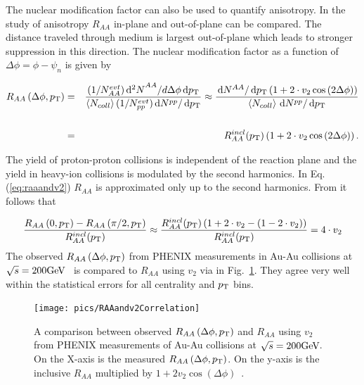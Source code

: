 The nuclear modification factor can also be used to quantify anisotropy. In the study of anisotropy $R_{AA}$ in-plane and out-of-plane can be compared. The distance traveled through medium is largest out-of-plane which leads to stronger suppression in this direction. The nuclear modification factor as a function of $\Delta\phi=\phi-\psi_n$ is given by

\begin{eqnarray}
R_{AA}\left(\Delta\phi, p_{\rm T}\right) &=& \frac{(1/N_{AA}^{evt})\,\textrm d{^2N}^{AA}/d\Delta\phi \,\textrm d{p_{\rm T}}}{\left< N_{coll}\right> (1/N_{pp}^{evt})\,\textrm d{N^{pp}}/\,\textrm d{p_{\rm T}}} \approx \frac{\,\textrm d{N^{AA}}/\,\textrm d{p_{\rm T}}\left( 1+2\cdot v_2\cos{(2\Delta\phi)} \right)}{\left< N_{coll}\right> \,\textrm d{N^{pp}}/\,\textrm d{p_{\rm T}}} \nonumber \\ &&\nonumber\\
&=& R_{AA}^{incl}(p_{\rm T}) \left( 1+2\cdot v_2\cos{(2\Delta\phi)} \right).
\label{eq:raaandv2}
\end{eqnarray}	

The yield of proton-proton collisions is independent of the reaction plane and the yield in heavy-ion collisions is modulated by the second harmonics. In Eq. (\ref{eq:raaandv2}) $R_{AA}$ is approximated only up to the second harmonics.
From  it follows that

\begin{equation}
\frac{R_{AA}\left(0, p_{\rm T}\right)-R_{AA}\left(\pi/2, p_{\rm T}\right)}{R_{AA}^{incl}(p_{\rm T})} \approx \frac{R_{AA}^{incl}(p_{\rm T}) \left(1+2 \cdot v_2-(1-2 \cdot v_2) \right)}{R_{AA}^{incl}(p_{\rm T})} = 4 \cdot v_2
\label{eq:raaandv2result}
\end{equation} 
The observed $R_{AA}\left(\Delta\phi, \pt{}\right)$  from PHENIX measurements in Au-Au collisions at $\sqrt{s}=200\mathrm{GeV}\kern-0.05em$~\cite{PhysRevC.80.054907} is compared to $R_{AA}$ using $v_2$  via  in Fig.~\ref{fig:RAAv2}. They agree very well within the statistical errors for all centrality and $p_{\rm T}$ bins.
\begin{figure}[htb]
	\centering
                \texttt{[image: pics/RAAandv2Correlation]}
        \caption[A comparison between observed $R_{AA}\left(\Delta\phi, \pt{}\right) $ and $R_{AA}$ using $v_2$]{ A comparison between observed $R_{AA}\left(\Delta\phi, \pt{}\right) $ and $R_{AA}$ using $v_2$ from PHENIX measurements of Au-Au collisions at $\sqrt{s}=200\mathrm{GeV}\kern-0.05em$. On the X-axis is the measured $R_{AA}\left(\Delta\phi,\pt{}\right)$. On the y-axis is the inclusive $R_{AA}$ multiplied by  $1+2v_2\cos\left(\Delta\phi\right)$~\cite{PhysRevC.80.054907}.}
        \label{fig:RAAv2}
\end{figure}

